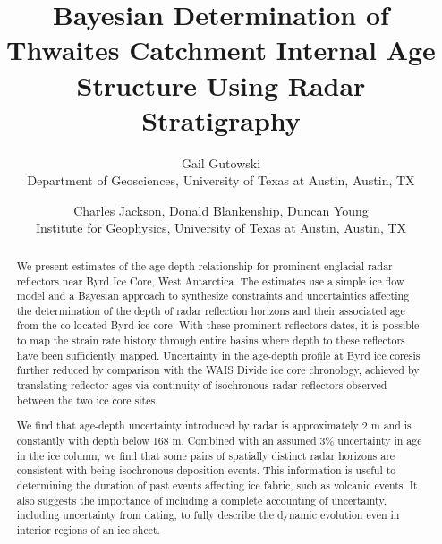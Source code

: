 \documentclass[12pt]{article}
\begin{document}
\title{Bayesian Determination of Thwaites Catchment Internal Age Structure Using Radar Stratigraphy}
\author{Gail Gutowski\\ Department of Geosciences, University of Texas at Austin, Austin, TX \and Charles Jackson, Donald Blankenship, Duncan Young \\Institute for Geophysics, University of Texas at Austin, Austin, TX}
\maketitle


\begin{abstract}

We present estimates of the age-depth relationship for prominent englacial radar reflectors near Byrd Ice Core, West Antarctica. The estimates use a simple ice flow model and a Bayesian approach to synthesize constraints and uncertainties affecting the determination of the depth of radar reflection horizons and their associated age from the co-located Byrd ice core. With these prominent reflectors dates, it is possible to map the strain rate history through entire basins where depth to these reflectors have been sufficiently mapped. Uncertainty in the age-depth profile at Byrd ice coresis further reduced by comparison with the WAIS Divide ice core chronology, achieved by translating reflector ages via continuity of isochronous radar reflectors observed between the two ice core sites.

We find that age-depth uncertainty introduced by radar is approximately 2 m and is constantly with depth below 168 m. Combined with an assumed 3\% uncertainty in age in the ice column, we find that some pairs of spatially distinct radar horizons are consistent with being isochronous deposition events. This information is useful to determining the duration of past events affecting ice fabric, such as volcanic events. It also suggests the importance of including a complete accounting of uncertainty, including uncertainty from dating, to fully describe the dynamic evolution even in interior regions of an ice sheet.
\end{abstract}
\end{document}
